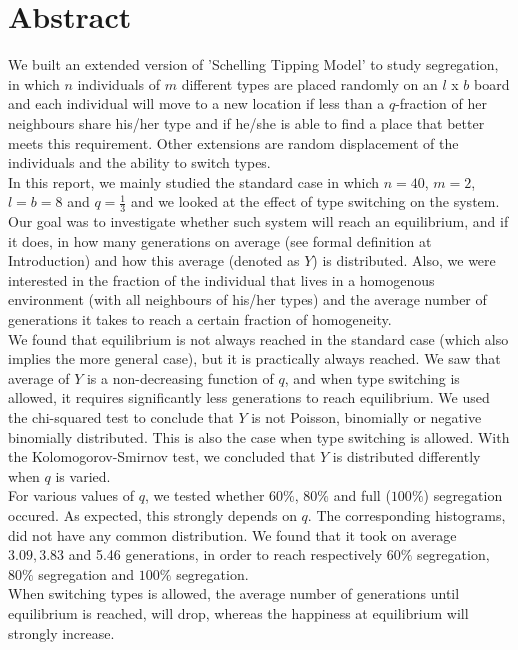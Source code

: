 \section*{Abstract}
We built an extended version of 'Schelling Tipping Model' to study segregation, in which $n$ individuals of $m$ different types are placed randomly on an $l$ x $b$ board and each individual will move to a new location if less than a $q$-fraction of her neighbours share his/her type and if he/she is able to find a place that better meets this requirement. Other extensions are random displacement of the individuals and the ability to switch types.\\

In this report, we mainly studied the standard case in which $n=40$, $m=2$, $l=b=8$ and $q=\frac{1}{3}$ and we looked at the effect of type switching on the system. 
Our goal was to investigate whether such system will reach an equilibrium, and if it does, in how many generations on average (see formal definition at Introduction) and how this average (denoted as $Y$) is distributed. 
Also, we were interested in the fraction of the individual that lives in a homogenous environment (with all neighbours of his/her types) and the average number of generations it takes to reach a certain fraction of homogeneity.\\

We found that equilibrium is not always reached in the standard case (which also implies the more general case), but it is practically always reached. We saw that average of $Y$ is a non-decreasing function of $q$, and when type switching is allowed, it requires significantly less generations to reach equilibrium. We used the chi-squared test to conclude that $Y$ is not Poisson, binomially or negative binomially distributed. This is also the case when type switching is allowed. With the Kolomogorov-Smirnov test, we concluded that $Y$ is distributed differently when $q$ is varied.\\

For various values of $q$, we tested whether $60\%$, $80\%$ and full ($100\%$) segregation occured. As expected, this strongly depends on $q$. The corresponding histograms, did not have any common distribution. We found that it took on average \(3.09,3.83\) and 5.46 generations, in order to reach respectively \(60\%\) segregation, \(80\%\) segregation and \(100\%\) segregation.\\

When switching types is allowed, the average number of generations until equilibrium is reached, will drop, whereas the happiness at equilibrium will strongly increase.